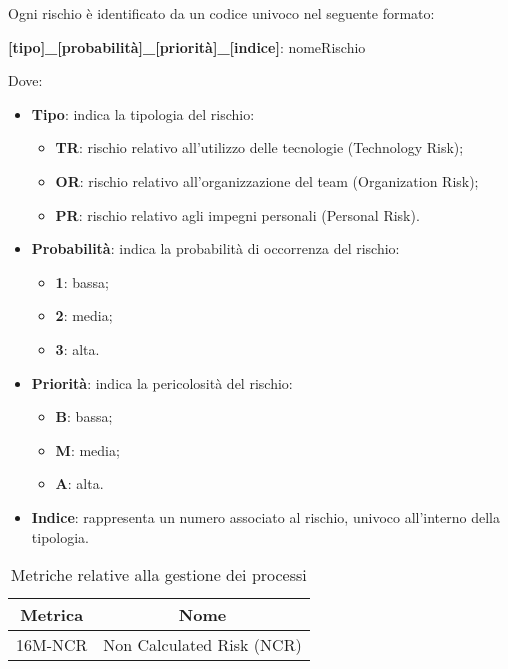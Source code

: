 Ogni rischio è identificato da un codice univoco nel seguente formato:
\begin{center}
    \textbf{[tipo]\_[probabilità]\_[priorità]\_[indice]}: nomeRischio
\end{center}
Dove:
\begin{itemize}
    \item \textbf{Tipo}: indica la tipologia del rischio:
        \begin{itemize}
            \item \textbf{TR}: rischio relativo all'utilizzo delle tecnologie (Technology Risk);
            \item \textbf{OR}: rischio relativo all'organizzazione del team (Organization Risk);
            \item \textbf{PR}: rischio relativo agli impegni personali (Personal Risk).
        \end{itemize}
    \item \textbf{Probabilità}: indica la probabilità di occorrenza del rischio:
        \begin{itemize}
            \item \textbf{1}: bassa;
            \item \textbf{2}: media;
            \item \textbf{3}: alta.
        \end{itemize}
    \item \textbf{Priorità}: indica la pericolosità del rischio:
        \begin{itemize}
            \item \textbf{B}: bassa;
            \item \textbf{M}: media;
            \item \textbf{A}: alta.
        \end{itemize}
    \item \textbf{Indice}: rappresenta un numero associato al rischio, univoco all'interno della tipologia.
\end{itemize}

\begin{table}[h] 
    \caption{Metriche relative alla gestione dei processi}
    \centering
    \begin{tabular}{|c|c|}
    \hline
    \textbf{Metrica} & \textbf{Nome} \\
    \hline
    16M-NCR & Non Calculated Risk (NCR) \\
    \hline
    \end{tabular}
\end{table}

